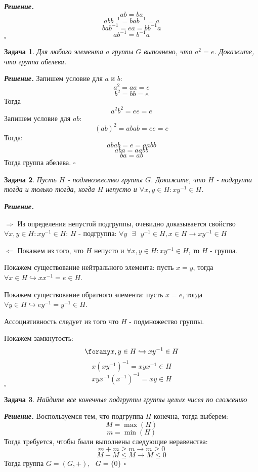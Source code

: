 \documentclass[12pt]{article}
\newtheorem{problem}{Задача}
\newenvironment{solution}[1][\it{Решение}]{\textbf{#1. } }{$\square$}
\begin{document}
\begin{solution}
$$ab = ba$$
$$abb^{-1} = bab^{-1} = a$$
$$bab^{-1} = ea = bb^{-1}a$$
$$ab^{-1} = b^{-1}a$$
\end{solution}

\newpage

\begin{problem}
    Для любого элемента $a$ группы $G$ выполнено, что $a^2=e$. Докажите, что группа абелева.
\end{problem}

 \begin{solution}
Запишем условие для $a$ и $b$:
$$a^{2} = aa = e$$
$$b^{2} = bb = e$$
Тогда $$a^2b^2 = ee = e$$
Запишем условие для $ab$:
$$(ab)^{2} = abab = ee = e $$
Тогда:
$$abab = e = aabb$$
$$aba = aabb$$
$$ba = ab$$
Тогда группа абелева.
 \end{solution}

 \begin{problem}
     Пусть $H$ - подмножество группы $G$. Докажите, что $H$ - подгруппа тогда и только тогда, когда $H$ непусто и $\forall x, y \in H: x y^{-1} \in H$.
 \end{problem}
 
\begin{solution}

$\Rightarrow$ Из определения непустой подгруппы, очевидно доказывается свойство $\forall x, y \in H: x y^{-1} \in H$: $H$ - подгруппа: $\forall y \text{ } \exists \text{ }y^{-1} \in H, x \in H \rightarrow x y^{-1} \in H$

$\Leftarrow$ Покажем из того, что $H$ непусто и $\forall x, y \in H: x y^{-1} \in H$, то $H$ - группа.

Покажем существование нейтрального элемента: пусть $x = y$, тогда
$\forall x \in H \hookrightarrow x x^{-1} = e \in H$. 

Покажем существование обратного элемента: пусть $x = e$, тогда
$\forall y \in H \hookrightarrow e y^{-1} = y^{-1} \in H$. 

Ассоциативность следует из того что $H$ - подмножество группы.


Покажем замкнутость:
$$\forany x, y \in H \hookrightarrow xy^{-1} \in H$$
$$ x(xy^{-1})^{-1} = xyx^{-1} \in H$$
$$ xyx^{-1} (x^{-1})^{-1} = xy \in H $$
\end{solution}

\begin{problem}
Найдите все конечные подгруппы группы целых чисел по сложению
\end{problem}

\begin{solution}
Воспользуемся тем, что подгруппа $H$ конечна, тогда выберем:
$$M = \max(H) $$
$$m = \min(H) $$
Тогда требуется, чтобы были выполнены следующие неравенства:
$$m + m \geq m \rightarrow m \geq 0$$
$$M + M \leq M \rightarrow M \leq 0$$
Тогда группа $G = (G, +), \text{ } G = \{0\}$
\end{solution}
\end{document}
